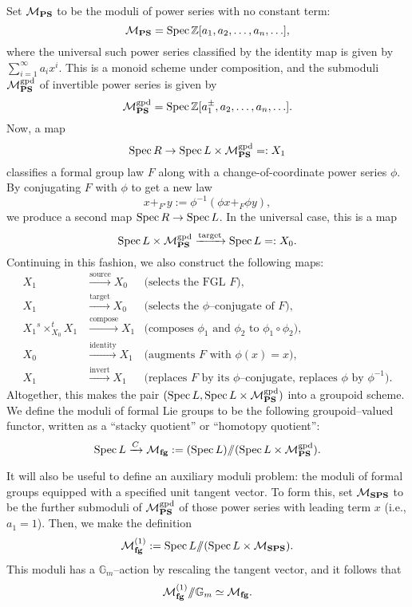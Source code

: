 \begin{definition}
Set $\mathcal{M}_{\mathbf{PS}}$ to be the moduli of power series with no constant term: \[\mathcal{M}_{\mathbf{PS}} = \operatorname{Spec} \mathbb Z[a_1, a_2, \ldots, a_n, \ldots],\] where the universal such power series classified by the identity map is given by $\sum_{i=1}^\infty a_i x^i$.  This is a monoid scheme under composition, and the submoduli $\mathcal{M}_{\mathbf{PS}}^{\mathrm{gpd}}$ of invertible power series is given by \[\mathcal{M}_{\mathbf{PS}}^{\mathrm{gpd}} = \operatorname{Spec} \mathbb Z[a_1^\pm, a_2, \ldots, a_n, \ldots].\]  Now, a map \[\operatorname{Spec} R \to \operatorname{Spec} L \times \mathcal{M}_{\mathbf{PS}}^{\mathrm{gpd}} =: X_1\] classifies a formal group law $F$ along with a change-of-coordinate power series $\phi$.  By conjugating $F$ with $\phi$ to get a new law \[x +_{F'} y := \phi^{-1}(\phi x +_F \phi y),\] we produce a second map $\operatorname{Spec} R \to \operatorname{Spec} L$.  In the universal case, this is a map \[\operatorname{Spec} L \times \mathcal{M}_{\mathbf{PS}}^{\mathrm{gpd}} \xrightarrow{\text{target}} \operatorname{Spec} L =: X_0.\]  Continuing in this fashion, we also construct the following maps:
\begin{align*}
X_1 & \xrightarrow{\text{source}} X_0 & \text{(selects the FGL $F$)}, \\
X_1 & \xrightarrow{\text{target}} X_0 & \text{(selects the $\phi$--conjugate of $F$)}, \\
X_1 {{}^s \times_{X_0}^t} X_1 & \xrightarrow{\text{compose}} X_1 & \text{(composes $\phi_1$ and $\phi_2$ to $\phi_1 \circ \phi_2$)}, \\
X_0 & \xrightarrow{\text{identity}} X_1 & \text{(augments $F$ with $\phi(x) = x$)}, \\
X_1 & \xrightarrow{\text{invert}} X_1 & \text{(replaces $F$ by its $\phi$--conjugate, replaces $\phi$ by $\phi^{-1}$)}.
\end{align*}
Altogether, this makes the pair $(\operatorname{Spec} L, \operatorname{Spec} L \times \mathcal{M}_{\mathbf{PS}}^{\mathrm{gpd}})$ into a groupoid scheme.  We define the moduli of formal Lie groups to be the following groupoid--valued functor, written as a ``stacky quotient'' or ``homotopy quotient'': \[\operatorname{Spec} L \xrightarrow{C} \mathcal{M}_{\mathbf{fg}} := (\operatorname{Spec} L) /\!\!/ (\operatorname{Spec} L \times \mathcal{M}_{\mathbf{PS}}^{\mathrm{gpd}}).\]
\end{definition}

\begin{definition}\label{StrictModuliOfFGs}
It will also be useful to define an auxiliary moduli problem: the moduli of formal groups equipped with a specified unit tangent vector.  To form this, set $\mathcal{M}_{\mathbf{SPS}}$ to be the further submoduli of $\mathcal{M}_{\mathbf{PS}}^{\mathrm{gpd}}$ of those power series with leading term $x$ (i.e., $a_1 = 1$).  Then, we make the definition \[\mathcal{M}_{\mathbf{fg}}^{(1)} := \operatorname{Spec} L /\!\!/ (\operatorname{Spec} L \times \mathcal{M}_{\mathbf{SPS}}).\]  This moduli has a $\mathbb G_m$--action by rescaling the tangent vector, and it follows that \[\mathcal{M}_{\mathbf{fg}}^{(1)} /\!\!/ \mathbb G_m \simeq \mathcal{M}_{\mathbf{fg}}.\]
\end{definition}

